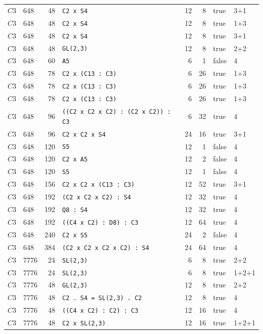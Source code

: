 \begin{longtable}{llrlrrll}
$C3$ & 648 & 48 & \texttt{C2 x S4} & 12 & 8 & true & 3+1\\
$C3$ & 648 & 48 & \texttt{C2 x S4} & 12 & 8 & true & 1+3\\
$C3$ & 648 & 48 & \texttt{C2 x S4} & 12 & 8 & true & 3+1\\
$C3$ & 648 & 48 & \texttt{GL(2,3)} & 12 & 8 & true & 2+2\\
$C3$ & 648 & 60 & \texttt{A5} & 6 & 1 & false & 4\\
$C3$ & 648 & 78 & \texttt{C2 x (C13 : C3)} & 6 & 26 & true & 1+3\\
$C3$ & 648 & 78 & \texttt{C2 x (C13 : C3)} & 6 & 26 & true & 1+3\\
$C3$ & 648 & 78 & \texttt{C2 x (C13 : C3)} & 6 & 26 & true & 1+3\\
$C3$ & 648 & 96 & \texttt{((C2 x C2 x C2) : (C2 x C2)) : C3} & 6 & 32 & true & 4\\
$C3$ & 648 & 96 & \texttt{C2 x C2 x S4} & 24 & 16 & true & 3+1\\
$C3$ & 648 & 120 & \texttt{S5} & 12 & 1 & false & 4\\
$C3$ & 648 & 120 & \texttt{C2 x A5} & 12 & 2 & false & 4\\
$C3$ & 648 & 120 & \texttt{S5} & 12 & 1 & false & 4\\
$C3$ & 648 & 156 & \texttt{C2 x C2 x (C13 : C3)} & 12 & 52 & true & 3+1\\
$C3$ & 648 & 192 & \texttt{(C2 x C2 x C2) : S4} & 12 & 32 & true & 4\\
$C3$ & 648 & 192 & \texttt{Q8 : S4} & 12 & 32 & true & 4\\
$C3$ & 648 & 192 & \texttt{((C4 x C2) : D8) : C3} & 12 & 64 & true & 4\\
$C3$ & 648 & 240 & \texttt{C2 x S5} & 24 & 2 & false & 4\\
$C3$ & 648 & 384 & \texttt{(C2 x C2 x C2 x C2) : S4} & 24 & 64 & true & 4\\
$C3$ & 7776 & 24 & \texttt{SL(2,3)} & 6 & 8 & true & 2+2\\
$C3$ & 7776 & 24 & \texttt{SL(2,3)} & 6 & 8 & true & 1+2+1\\
$C3$ & 7776 & 48 & \texttt{GL(2,3)} & 12 & 8 & true & 2+2\\
$C3$ & 7776 & 48 & \texttt{C2 . S4 = SL(2,3) . C2} & 12 & 8 & true & 4\\
$C3$ & 7776 & 48 & \texttt{((C4 x C2) : C2) : C3} & 12 & 16 & true & 4\\
$C3$ & 7776 & 48 & \texttt{C2 x SL(2,3)} & 12 & 16 & true & 1+2+1\\

\end{longtable}
